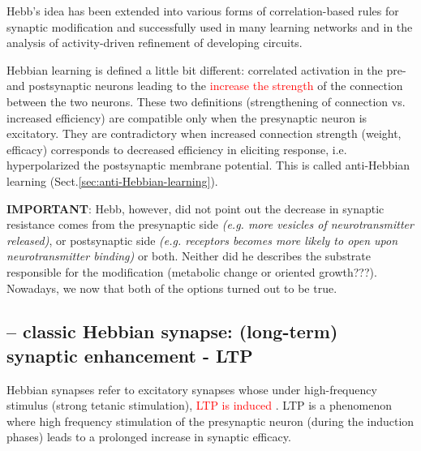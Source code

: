 Hebb's idea has been extended into various forms of correlation-based rules for
synaptic modification and successfully used in many learning networks and in the
analysis of activity-driven refinement of developing circuits.

Hebbian learning is defined a little bit different:
correlated activation in the pre- and postsynaptic neurons leading to the
\textcolor{red}{increase the strength} of the connection between the two
neurons. These two definitions (strengthening of connection vs. increased
efficiency) are compatible only when the presynaptic neuron is excitatory.
They are contradictory when increased connection strength (weight, efficacy)
corresponds to decreased efficiency in eliciting response, i.e. hyperpolarized
the postsynaptic membrane potential. This is called anti-Hebbian learning
(Sect.\ref{sec:anti-Hebbian-learning}).




{\bf IMPORTANT}: Hebb, however, did not point out the decrease in synaptic
resistance comes from the presynaptic side {\it (e.g. more vesicles of
neurotransmitter released)}, or postsynaptic side {\it (e.g. receptors becomes
more likely to open upon neurotransmitter binding)} or both. Neither did he
describes the substrate responsible for the modification (metabolic change or
oriented growth???). Nowadays, we now that both of the options turned out to be
true.

\subsection{ -- classic Hebbian synapse: (long-term) synaptic enhancement -
LTP}
\label{sec:Hebbian-synapse}
\label{sec:Hebbian-plasticity}

Hebbian synapses refer to excitatory synapses whose under high-frequency
stimulus (strong tetanic stimulation), \textcolor{red}{LTP is induced }.
LTP is a phenomenon where high frequency stimulation of the presynaptic neuron
(during the induction phases) leads to a prolonged increase in synaptic
efficacy.

